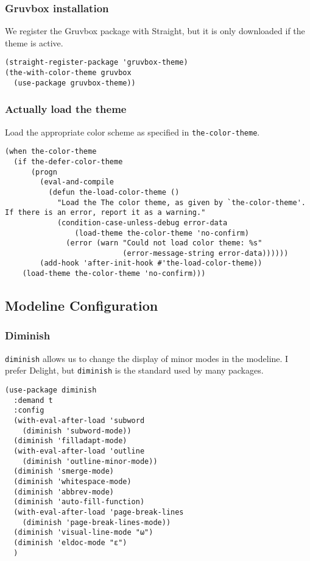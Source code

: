 \documentclass[11pt]{article}
\begin{document}
\subsubsection{Gruvbox installation}
\label{sec:org3b35143}
We register the Gruvbox package with Straight, but it is only
downloaded if the theme is active.
\begin{verbatim}
(straight-register-package 'gruvbox-theme)
(the-with-color-theme gruvbox
  (use-package gruvbox-theme))
\end{verbatim}

\subsubsection{Actually load the theme}
\label{sec:org78211fe}
Load the appropriate color scheme as specified in
\texttt{the-color-theme}.
\begin{verbatim}
(when the-color-theme
  (if the-defer-color-theme
      (progn
        (eval-and-compile
          (defun the-load-color-theme ()
            "Load the The color theme, as given by `the-color-theme'.
If there is an error, report it as a warning."
            (condition-case-unless-debug error-data
                (load-theme the-color-theme 'no-confirm)
              (error (warn "Could not load color theme: %s"
                           (error-message-string error-data))))))
        (add-hook 'after-init-hook #'the-load-color-theme))
    (load-theme the-color-theme 'no-confirm)))
\end{verbatim}
\subsection{Modeline Configuration}
\label{sec:orgb64f408}
\subsubsection{Diminish}
\label{sec:org715eaf5}
\texttt{diminish} allows us to change the display of minor modes in the
modeline. I prefer Delight, but \texttt{diminish} is the standard used by
many packages.
\begin{verbatim}
(use-package diminish
  :demand t
  :config
  (with-eval-after-load 'subword
    (diminish 'subword-mode))
  (diminish 'filladapt-mode)
  (with-eval-after-load 'outline
    (diminish 'outline-minor-mode))
  (diminish 'smerge-mode)
  (diminish 'whitespace-mode)
  (diminish 'abbrev-mode)
  (diminish 'auto-fill-function)
  (with-eval-after-load 'page-break-lines
    (diminish 'page-break-lines-mode))
  (diminish 'visual-line-mode "ω")
  (diminish 'eldoc-mode "ε")
  )
\end{verbatim}
\end{document}

